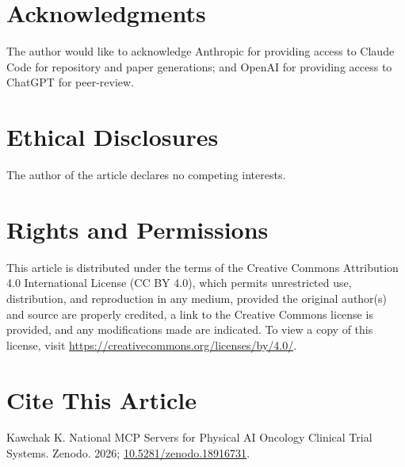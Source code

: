 \section*{Acknowledgments}

The author would like to acknowledge Anthropic for providing access to Claude Code for repository and paper generations; and OpenAI for providing access to ChatGPT for peer-review.

\section*{Ethical Disclosures}

The author of the article declares no competing interests.

\section*{Rights and Permissions}

This article is distributed under the terms of the Creative Commons Attribution 4.0 International License (CC BY 4.0), which permits unrestricted use, distribution, and reproduction in any medium, provided the original author(s) and source are properly credited, a link to the Creative Commons license is provided, and any modifications made are indicated. To view a copy of this license, visit \url{https://creativecommons.org/licenses/by/4.0/}.

\section*{Cite This Article}

Kawchak K. National MCP Servers for Physical AI Oncology Clinical Trial Systems. Zenodo. 2026; \href{https://doi.org/10.5281/zenodo.18916731}{10.5281/zenodo.18916731}.


